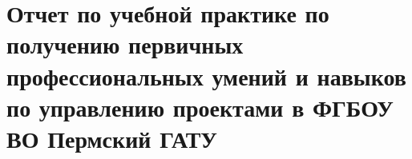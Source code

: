 \section{Отчет по учебной практике по получению первичных профессиональных умений и навыков по управлению проектами в ФГБОУ ВО Пермский ГАТУ}

\newpage

\newpage

\newpage

\newpage
